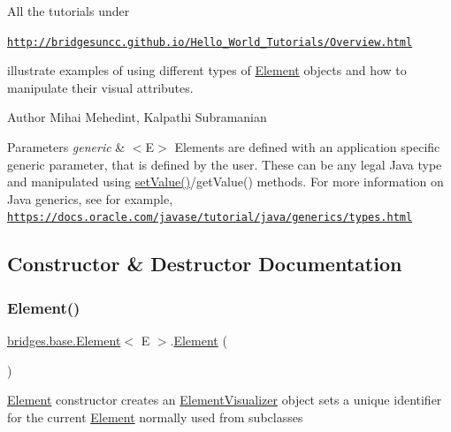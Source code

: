 All the tutorials under

\href{http://bridgesuncc.github.io/Hello_World_Tutorials/Overview.html}{\tt http\+://bridgesuncc.\+github.\+io/\+Hello\+\_\+\+World\+\_\+\+Tutorials/\+Overview.\+html}

illustrate examples of using different types of \hyperlink{classbridges_1_1base_1_1_element}{Element} objects and how to manipulate their visual attributes.

\begin{DoxyAuthor}{Author}
Mihai Mehedint, Kalpathi Subramanian
\end{DoxyAuthor}

\begin{DoxyParams}{Parameters}
{\em generic} & $<$\+E$>$ Elements are defined with an application specific generic parameter, that is defined by the user. These can be any legal Java type and manipulated using \hyperlink{classbridges_1_1base_1_1_element_ab3cf1241da0bc4c59cea9d6f0fd7aaf4}{set\+Value()}/get\+Value() methods. For more information on Java generics, see for example, \href{https://docs.oracle.com/javase/tutorial/java/generics/types.html}{\tt https\+://docs.\+oracle.\+com/javase/tutorial/java/generics/types.\+html} \\
\hline
\end{DoxyParams}


\subsection{Constructor \& Destructor Documentation}
\hypertarget{classbridges_1_1base_1_1_element_aa5fc5728f2ed4b041118a77409442390}{}\label{classbridges_1_1base_1_1_element_aa5fc5728f2ed4b041118a77409442390} 
\subsubsection{\texorpdfstring{Element()}{Element()}\hspace{0.1cm}{\footnotesize\ttfamily [1/4]}}
{\footnotesize\ttfamily \hyperlink{classbridges_1_1base_1_1_element}{bridges.\+base.\+Element}$<$ E $>$.\hyperlink{classbridges_1_1base_1_1_element}{Element} (\begin{DoxyParamCaption}{ }\end{DoxyParamCaption})}

\hyperlink{classbridges_1_1base_1_1_element}{Element} constructor creates an \hyperlink{classbridges_1_1base_1_1_element_visualizer}{Element\+Visualizer} object sets a unique identifier for the current \hyperlink{classbridges_1_1base_1_1_element}{Element} normally used from subclasses \hypertarget{classbridges_1_1base_1_1_element_a6cb9b3b85b923602aad5c1be6696d825}{}\label{classbridges_1_1base_1_1_element_a6cb9b3b85b923602aad5c1be6696d825} 

